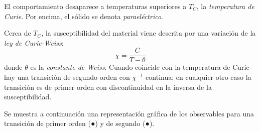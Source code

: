 \documentclass{tufte-book}
\newcommand{\sub}[1]{_{{\scriptscriptstyle\mathit{#1}}}}
\begin{document}
El comportamiento desaparece a temperaturas superiores a $T\sub{C}$, la
\emph{temperatura de Curie}. Por encima, el sólido se denota \emph{paraeléctrico}.


Cerca de $T\sub{C}$, la susceptibilidad del material viene descrita
por una variación de la \emph{ley de Curie-Weiss}:
\begin{equation}
  χ = \frac{C}{T-θ}
\end{equation}
donde $θ$ es la \emph{constante de Weiss}. Cuando coincide con la
temperatura de Curie hay una transición de segundo orden con $χ^{-1}$
continua; en cualquier otro caso la transición es de primer orden con
discontinuidad en la inversa de la susceptibilidad.

Se muestra a continuación una representación gráfica de los
observables para una transición de primer orden
(\textcolor{PlotDefault}{●}) y de segundo (\textcolor{PlotSecondary}{●}).
\end{document}
